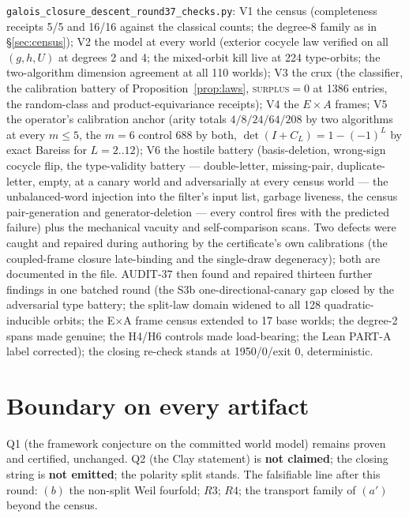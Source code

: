 \documentclass[11pt]{article}
\begin{document}
\texttt{galois\_closure\_descent\_round37\_checks.py}: V1 the census
(completeness receipts 5/5 and 16/16 against the classical counts; the
degree-8 family as in \S\ref{sec:census}); V2 the model at every world
(exterior cocycle law verified on all $(g,h,U)$ at degrees 2 and 4; the
mixed-orbit kill live at 224 type-orbits; the two-algorithm dimension
agreement at all 110 worlds); V3 the crux (the classifier, the calibration
battery of Proposition~\ref{prop:laws}, \textsc{surplus}$=0$ at 1386
entries, the random-class and product-equivariance receipts); V4 the
$E\times A$ frames; V5 the operator's calibration anchor (arity totals
$4/8/24/64/208$ by two algorithms at every $m\le5$, the $m=6$ control $688$
by both, $\det(I+C_L)=1-(-1)^L$ by exact Bareiss for $L=2..12$); V6 the
hostile battery (basis-deletion, wrong-sign cocycle flip, the type-validity
battery --- double-letter, missing-pair, duplicate-letter, empty, at a
canary world and adversarially at every census world --- the
unbalanced-word injection into the filter's input list, garbage liveness,
the census pair-generation and generator-deletion --- every
control fires with the predicted failure) plus the mechanical vacuity and
self-comparison scans. Two defects were caught and repaired during
authoring by the certificate's own calibrations (the coupled-frame
closure late-binding and the single-draw degeneracy); both are documented
in the file. AUDIT-37 then found and repaired thirteen further findings in
one batched round (the S3b one-directional-canary gap closed by the
adversarial type battery; the split-law domain widened to all 128
quadratic-inducible orbits; the E$\times$A frame census extended to 17
base worlds; the degree-2 spans made genuine; the H4/H6 controls made
load-bearing; the Lean PART-A label corrected); the closing re-check
stands at 1950/0/exit 0, deterministic.

\section*{Boundary on every artifact}

Q1 (the framework conjecture on the committed world model) remains proven
and certified, unchanged. Q2 (the Clay statement) is \textbf{not claimed};
the closing string is \textbf{not emitted}; the polarity split stands. The
falsifiable line after this round: $(b)$ the non-split Weil fourfold;
$R3$; $R4$; the transport family of $(a')$ beyond the census.
\end{document}
